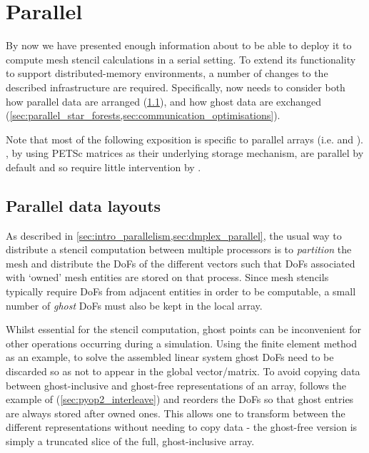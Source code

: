 \documentclass[thesis]{subfiles}
\begin{document}
\chapter{Parallel}
\label{chapter:parallel}

By now we have presented enough information about  to be able to deploy it to compute mesh stencil calculations in a serial setting.
To extend its functionality to support distributed-memory environments, a number of changes to the described infrastructure are required.
Specifically,  now needs to consider both how parallel data are arranged (\cref{sec:parallel_data_layouts}), and how ghost data are exchanged (\cref{sec:parallel_star_forests,sec:communication_optimisations}).

Note that most of the following exposition is specific to parallel arrays (i.e.  and ).
, by using PETSc matrices as their underlying storage mechanism, are parallel by default and so require little intervention by .

\section{Parallel data layouts}
\label{sec:parallel_data_layouts}

As described in \cref{sec:intro_parallelism,sec:dmplex_parallel}, the usual way to distribute a stencil computation between multiple processors is to \emph{partition} the mesh and distribute the DoFs of the different vectors such that DoFs associated with `owned' mesh entities are stored on that process.
Since mesh stencils typically require DoFs from adjacent entities in order to be computable, a small number of \emph{ghost} DoFs must also be kept in the local array.

Whilst essential for the stencil computation, ghost points can be inconvenient for other operations occurring during a simulation.
Using the finite element method as an example, to solve the assembled linear system ghost DoFs need to be discarded so as not to appear in the global vector/matrix.
To avoid copying data between ghost-inclusive and ghost-free representations of an array,  follows the example of  (\cref{sec:pyop2_interleave}) and reorders the DoFs so that ghost entries are always stored after owned ones.
This allows one to transform between the different representations without needing to copy data - the ghost-free version is simply a truncated slice of the full, ghost-inclusive array.
\end{document}

